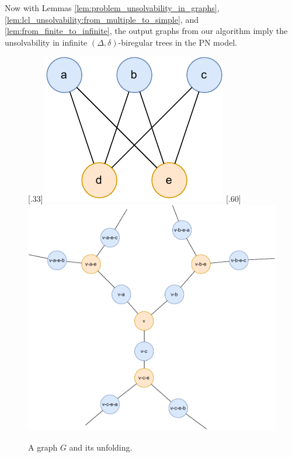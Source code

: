 
Now with Lemmas \ref{lem:problem_unsolvability_in_graphs}, \ref{lem:lcl_unsolvability:from_multiple_to_simple}, and \ref{lem:from_finite_to_infinite}, the output graphs from our algorithm imply the unsolvability in infinite $(\Delta, \delta)$-biregular trees in the PN model.

\begin{figure}[H]
      [.33\linewidth] {
      \centering
      \includegraphics[scale=0.55]{diagrams/universal_cover_1.pdf}
    }%
    \hfill
      [.60\linewidth] {
      \centering
      \includegraphics[scale=0.50]{diagrams/universal_cover_2.pdf}
    }
    \caption{A graph $G$ and its unfolding.
    }
    \label{fig:algorithm:universal_cover}
\end{figure}


